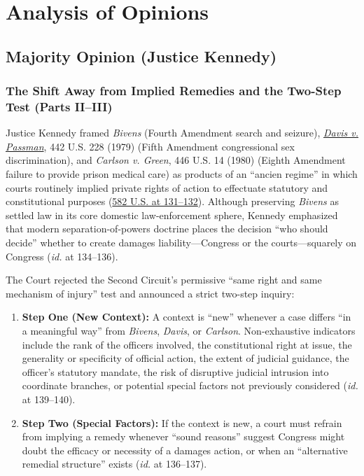 \documentclass[12pt]{article}
\begin{document}
\section{Analysis of Opinions}
\subsection{Majority Opinion (Justice Kennedy)}

\subsubsection{The Shift Away from Implied Remedies and the Two-Step Test (Parts II--III)}

Justice Kennedy framed \textit{Bivens} (Fourth Amendment search and seizure), \href{https://supreme.justia.com/cases/federal/us/442/228/}{\textit{Davis v. Passman}}, 442 U.S. 228 (1979) (Fifth Amendment congressional sex discrimination), and \textit{Carlson v. Green}, 446 U.S. 14 (1980) (Eighth Amendment failure to provide prison medical care) as products of an ``ancien regime'' in which courts routinely implied private rights of action to effectuate statutory and constitutional purposes (\href{https://www.law.cornell.edu/supremecourt/text/15-1358}{582 U.S. at 131--132}). Although preserving \textit{Bivens} as settled law in its core domestic law-enforcement sphere, Kennedy emphasized that modern separation-of-powers doctrine places the decision ``who should decide'' whether to create damages liability---Congress or the courts---squarely on Congress (\textit{id.} at 134--136).

The Court rejected the Second Circuit's permissive ``same right and same mechanism of injury'' test and announced a strict two-step inquiry:
\begin{enumerate}
  \item \textbf{Step One (New Context):} A context is ``new'' whenever a case differs ``in a meaningful way'' from \textit{Bivens}, \textit{Davis}, or \textit{Carlson}. Non-exhaustive indicators include the rank of the officers involved, the constitutional right at issue, the generality or specificity of official action, the extent of judicial guidance, the officer's statutory mandate, the risk of disruptive judicial intrusion into coordinate branches, or potential special factors not previously considered (\textit{id.} at 139--140).
  \item \textbf{Step Two (Special Factors):} If the context is new, a court must refrain from implying a remedy whenever ``sound reasons'' suggest Congress might doubt the efficacy or necessity of a damages action, or when an ``alternative remedial structure'' exists (\textit{id.} at 136--137).
\end{enumerate}
\end{document}
